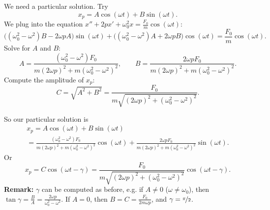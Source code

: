 \documentclass[10pt,aspectratio=169]{beamer}
\begin{document}
\begin{frame}
We need a particular solution.  Try
\[
x_p = A \cos (\omega t) + B \sin (\omega t).
\]
\pause
We plug into the equation $x'' + 2px' + \omega_0^2x = \frac{F_0}{m} \cos
(\omega t)$:
\[
\bigl((\omega_0^2  - \omega^2)B - 2\omega p A\bigr) \sin (\omega t)
+
\bigl((\omega_0^2  - \omega^2)A + 2\omega p B\bigr) \cos (\omega t)
=
\frac{F_0}{m} \cos (\omega t) .
\]
\pause
Solve for $A$ and $B$:
\[
A=\frac{(\omega_0^2-\omega^2) F_0}
{m{(2\omega p)}^2+m{(\omega_0^2-\omega^2)}^2} ,
\qquad
B=\frac{2 \omega p F_0}
{m{(2\omega p)}^2+m{(\omega_0^2-\omega^2)}^2} .
\]
Compute the amplitude of $x_p$:
\[
C = \sqrt{A^2+B^2} = \frac{F_0}{m \sqrt{{(2\omega p)}^2+{(\omega_0^2-\omega^2)}^2}} .
\]
\end{frame}

\begin{frame}
So our particular solution is
\begin{multline*}
x_p = 
A \cos (\omega t) + B \sin (\omega t)
\\
=
\frac{(\omega_0^2-\omega^2) F_0}
{m{(2\omega p)}^2+m{(\omega_0^2-\omega^2)}^2} \cos (\omega t) +
\frac{2 \omega p F_0}
{m{(2\omega p)}^2+m{(\omega_0^2-\omega^2)}^2} \sin (\omega t) .
\end{multline*}
\pause
Or
\[
x_p = 
C \cos(\omega t - \gamma)
=
\frac{F_0}{m \sqrt{{(2\omega p)}^2+{(\omega_0^2-\omega^2)}^2}} 
\cos ( \omega t - \gamma ) .
\]
\pause
\textbf{Remark:}
$\gamma$ can be computed as before, e.g. if 
$A \neq 0$ ($\omega \neq \omega_0$), then
$\tan \gamma = \frac{B}{A} = \frac{2\omega p}{\omega_0^2-\omega^2}$.
If $A=0$, then $B = C = \frac{F_0}{2m\omega p}$,
and $\gamma = \nicefrac{\pi}{2}$.
\end{frame}
\end{document}
